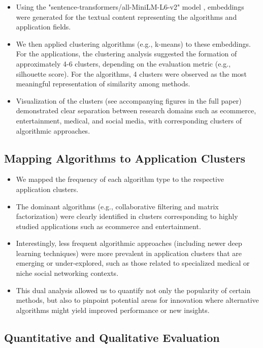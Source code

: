 \documentclass[
	a4paper, %
	10pt, %
	unnumberedsections, %
	twoside, %
]{LTJournalArticle}
\begin{document}
\begin{itemize}
    \item Using the "sentence-transformers/all-MiniLM-L6-v2" model \cite{reimers-2019-sentence-bert}, embeddings were generated for the textual content representing the algorithms and application fields.    
    \item We then applied clustering algorithms (e.g., k-means) to these embeddings. For the applications, the clustering analysis suggested the formation of approximately 4-6 clusters, depending on the evaluation metric (e.g., silhouette score). For the algorithms, 4 clusters were observed as the most meaningful representation of similarity among methods.  
    \item Visualization of the clusters (see accompanying figures in the full paper) demonstrated clear separation between research domains such as ecommerce, entertainment, medical, and social media, with corresponding clusters of algorithmic approaches.
\end{itemize}

\subsection{Mapping Algorithms to Application Clusters}

\begin{itemize}
    \item We mapped the frequency of each algorithm type to the respective application clusters.    
    \item The dominant algorithms (e.g., collaborative filtering and matrix factorization) were clearly identified in clusters corresponding to highly studied applications such as ecommerce and entertainment.    
    \item Interestingly, less frequent algorithmic approaches (including newer deep learning techniques) were more prevalent in application clusters that are emerging or under-explored, such as those related to specialized medical or niche social networking contexts.  
    \item This dual analysis allowed us to quantify not only the popularity of certain methods, but also to pinpoint potential areas for innovation where alternative algorithms might yield improved performance or new insights.
\end{itemize}

\subsection{Quantitative and Qualitative Evaluation}
\end{document}
